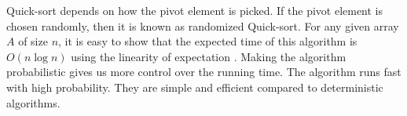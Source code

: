 Quick-sort depends on how the pivot element is picked.
If the pivot element is chosen randomly, then it is known as randomized Quick-sort.
For any given array $A$ of size $n$, it is easy to show that the expected time of this algorithm is $O(n \log n)$ using the linearity of expectation \citep{motwani2010randomized}.
Making the algorithm probabilistic gives us more control over the running time.
The algorithm runs fast with high probability. They are simple and efficient compared to deterministic algorithms.
% 
% 
